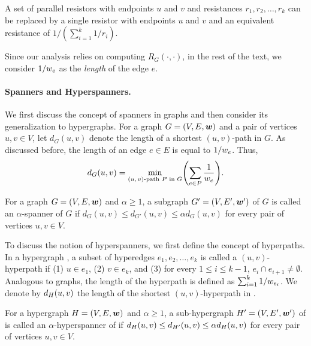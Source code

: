 \begin{fact}
A set of parallel resistors with endpoints \( u \) and \( v \) and resistances \( r_1, r_2, \dots, r_k \) can be replaced by a single resistor with endpoints \( u \) and \( v \) and an equivalent resistance of \( 1 / \left( \sum_{i = 1} ^k 1/r_i \right) \).
\end{fact}

Since our analysis relies on computing \( R_G(\cdot, \cdot) \), in the rest of the text, we consider \( 1 /  w_{e}  \) as the \textit{length} of the edge \( e \). 



\paragraph{Spanners and Hyperspanners.}
We first discuss the concept of spanners in graphs and then consider its generalization to hypergraphs.
For a graph \( G = (V, E, \boldsymbol{w}) \) and a pair of vertices \( u, v \in V \), let \( d_G(u , v) \) denote the length of a shortest \( (u, v) \)-path in \( G \).
As discussed before, the length of an edge \( e \in E \) is equal to \( 1/ w_{e}  \).
Thus,
\begin{equation*}
d_G(u, v) = \min _{\text{\( (u, v) \)-path \( P \) in \( G \)}} \left( \sum_{e \in P} \frac{1}{\w{e}} \right).
\end{equation*}
\begin{definition}
For a graph \( G = (V, E, \boldsymbol{w}) \) and \( \alpha \geq 1 \), a subgraph \( G' = (V, E', \boldsymbol{w}') \) of \( G \) is called an \( \alpha \)-spanner of \( G \) if \( d_G(u, v) \leq d_{G'}(u, v) \leq \alpha d_G(u, v) \) for every pair of vertices \( u, v \in V \).
\end{definition}

To discuss the notion of hyperspanners, we first define the concept of hyperpaths.
In a hypergraph , a subset of hyperedges \( e_1, e_2, \dots, e_k \) is called a \( (u, v) \)-hyperpath if (1) \( u \in e_1 \), (2) \( v \in e_k \), and (3) for every \( 1 \leq i \leq k - 1 \), \( e_i \cap e_{i + 1} \neq \emptyset \).
Analogous to graphs, the length of the hyperpath is defined as \( \sum_{i = 1} ^k 1/ w_{e_i}  \).
We denote by \( d_{ H} (u, v) \) the length of the shortest \( (u, v) \)-hyperpath in .

\begin{definition}
For a hypergraph \( { H} = (V, E, \boldsymbol{w}) \) and \( \alpha \geq 1 \), a sub-hypergraph \( { H'} = (V, E', \boldsymbol{w}') \) of  is called an \( \alpha \)-hyperspanner of  if \( d_{ H}(u, v) \leq d_{ H'}(u, v) \leq \alpha d_{ H}(u, v) \) for every pair of vertices \( u, v \in V \).
\end{definition}

